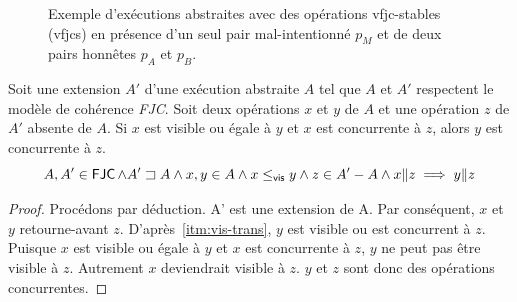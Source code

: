 \begin{figure}[htb]
\begin{subfigure}{\linewidth}
\caption{}\label{fig:vfjcs-one-malicious-3}
\end{subfigure}
\caption[Stabilité \acl{VFJC} en présence d'un pair mal-intentionné]{Exemple d'exécutions abstraites avec des opérations vfjc-stables (vfjcs) en présence d'un seul pair mal-intentionné $p_M$ et de deux pairs honnêtes $p_A$ et $p_B$.}\label{fig:vfjcs-one-malicious}
\end{figure}

\begin{proposition}\label{th:concur-triad}
Soit une extension $A'$ d'une exécution abstraite $A$ tel que $A$ et $A'$ respectent le modèle de cohérence \emph{FJC}.
Soit deux opérations $x$ et $y$ de $A$ et une opération $z$ de $A'$ absente de $A$.
Si $x$ est visible ou égale à $y$ et $x$ est concurrente à $z$, alors $y$ est concurrente à $z$.
\begin{equation*}
    A, A' \in \operatorname{\mathsf{FJC}} \land A' \sqsupset A \land x, y \in A \land x \leq_{\operatorname{\mathsf{vis}}} y \land z \in A'- A \land x \| z \implies y \| z
\end{equation*}
\end{proposition}

\begin{proof}
Procédons par déduction.
A' est une extension de A.
Par conséquent, $x$ et $y$ retourne-avant $z$.
D'après~\ref{itm:vis-trans}, $y$ est visible ou est concurrent à $z$.
Puisque $x$ est visible ou égale à $y$ et $x$ est concurrente à $z$, $y$ ne peut pas être visible à $z$.
Autrement $x$ deviendrait visible à $z$.
$y$ et $z$ sont donc des opérations concurrentes.
\end{proof}



